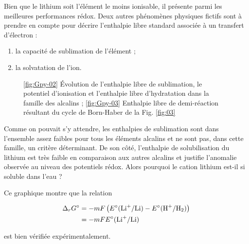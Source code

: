 Bien que le lithium soit l'élément le moins ionisable, il présente parmi les meilleures performances rédox. Deux autres phénomènes physiques fictifs sont à prendre en compte pour décrire l'enthalpie libre standard associée à un transfert d'électron : 
\begin{enumerate}
\item la capacité de sublimation de l'élément ;
\item la solvatation de l'ion.
\end{enumerate}


\begin{figure}[H]
\begin{centering}
\subfloat[\label{fig:Gpy-02}]{\resizebox{!}{0.45\linewidth}{}}
\subfloat[\label{fig:Gpy-03}]{\resizebox{!}{0.45\linewidth}{}}
\end{centering}
\caption{\ref{fig:Gpy-02} \'{E}volution de l'enthalpie libre de sublimation, le potentiel d'ionisation et l'enthalpie libre d'hydratation dans la famille des alcalins ; \ref{fig:Gpy-03} Enthalpie libre de demi-réaction résultant du cycle de Born-Haber de la Fig. \ref{fig:03}}
\end{figure}

Comme on pouvait s'y attendre, les enthalpies de sublimation sont dans l'ensemble assez faibles pour tous les éléments alcalins et ne sont pas, dans cette famille, un critère déterminant. De son côté, l'enthalpie de solubilisation du lithium est très faible en comparaison aux autres alcalins et justifie l'anomalie observée au niveau des potentiels rédox. Alors pourquoi le cation lithium est-il si soluble dans l'eau ?


\begin{minipage}[]{0.5\textwidth}
\centering
\resizebox{1.0\linewidth}{!}{}
\end{minipage}\hfill\begin{minipage}[]{0.45\textwidth}

Ce graphique montre que la relation 

\begin{align*}
\Delta_r G^\circ &= -mF \left( E^\circ (\ce{Li^+} / \ce{Li}) - E^\circ ( \ce{H^+} / \ce{H2}) \right) \\
&= -mF E^\circ (\ce{Li^+} / \ce{Li})
\end{align*}

est bien vérifiée expérimentalement.

\end{minipage}


